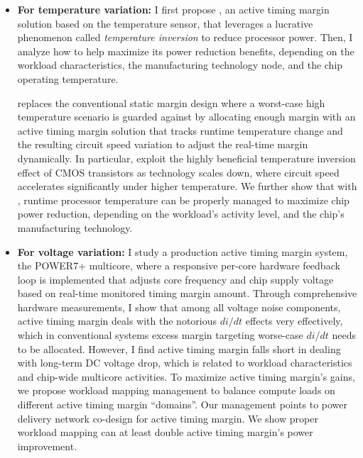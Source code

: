 \begin{itemize}

\item \textbf{For temperature variation:} I first propose \tistates, an active timing margin solution based on the temperature sensor, that leverages a lucrative phenomenon called \textit{temperature inversion} to reduce processor power. Then, I analyze how to help \tistates maximize its power reduction benefits, depending on the workload characteristics, the manufacturing technology node, and the chip operating temperature.

\tistates replaces the conventional static margin design where a worst-case high temperature scenario is guarded against by allocating enough margin with an active timing margin solution that tracks runtime temperature change and the resulting circuit speed variation to adjust the real-time margin dynamically. In particular, \tistates exploit the highly beneficial temperature inversion effect of CMOS transistors as technology scales down, where circuit speed accelerates significantly under higher temperature. We further show that with \tistates, runtime processor temperature can be properly managed to maximize chip power reduction, depending on the workload's activity level, and the chip's manufacturing technology.

\item \textbf{For voltage variation:}  I study a production active timing margin system, the POWER7+ multicore, where a responsive per-core hardware feedback loop is implemented that adjusts core frequency and chip supply voltage based on real-time monitored timing margin amount. Through comprehensive hardware measurements, I show that among all voltage noise components, active timing margin deals with the notorious $di/dt$ effects very effectively, which in conventional systems excess margin targeting worse-case $di/dt$ needs to be allocated. However, I find active timing margin falls short in dealing with long-term DC voltage drop, which is related to workload characteristics and chip-wide multicore activities. To maximize active timing margin's gains, we propose workload mapping management to balance compute loads on different active timing margin ``domains''. Our management points to power delivery network co-design for active timing margin. We show proper workload mapping can at least double active timing margin's power improvement.


\end{itemize}
